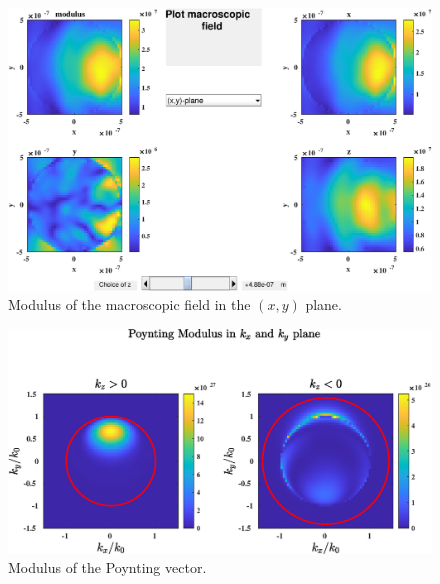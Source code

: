 \begin{figure}[H]
\begin{center}
  \includegraphics*[width=15.0cm,draft=false]{test2macro.eps}
\end{center}
\caption{Modulus of the macroscopic field in the $(x,y)$ plane.}
\end{figure}


\begin{figure}[H]
\begin{center}
  \includegraphics*[width=15.0cm,draft=false]{test2poynting2d.eps}
\end{center}
\caption{Modulus of the Poynting vector.}
\end{figure}


